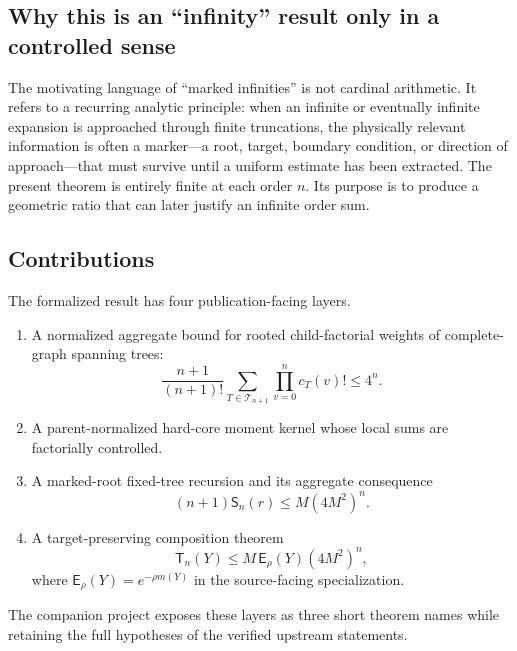 \documentclass[11pt]{article}
\newcommand{\Tree}{\mathcal T}
\newcommand{\ExpW}{\mathsf E}
\newcommand{\TargetTerm}{\mathsf T}
\newcommand{\MarkedSum}{\mathsf S}
\begin{document}
\subsection{Why this is an ``infinity'' result only in a controlled sense}

The motivating language of ``marked infinities'' is not cardinal arithmetic.  It refers to a recurring analytic principle: when an infinite or eventually infinite expansion is approached through finite truncations, the physically relevant information is often a marker---a root, target, boundary condition, or direction of approach---that must survive until a uniform estimate has been extracted.  The present theorem is entirely finite at each order $n$.  Its purpose is to produce a geometric ratio that can later justify an infinite order sum.

\subsection{Contributions}

The formalized result has four publication-facing layers.
\begin{enumerate}[leftmargin=2.5em]
  \item A normalized aggregate bound for rooted child-factorial weights of complete-graph spanning trees:
  \begin{equation}\label{eq:four-bound-intro}
    \frac{n+1}{(n+1)!}
    \sum_{T\in\Tree_{n+1}}
    \prod_{v=0}^{n} c_T(v)!
    \le 4^n.
  \end{equation}
  \item A parent-normalized hard-core moment kernel whose local sums are factorially controlled.
  \item A marked-root fixed-tree recursion and its aggregate consequence
  \begin{equation}\label{eq:marked-intro}
    (n+1)\MarkedSum_n(r)\le M(4M^2)^n.
  \end{equation}
  \item A target-preserving composition theorem
  \begin{equation}\label{eq:target-intro}
    \TargetTerm_n(Y)\le M\,\ExpW_\rho(Y)(4M^2)^n,
  \end{equation}
  where $\ExpW_\rho(Y)=e^{-\rho m(Y)}$ in the source-facing specialization.
\end{enumerate}

The companion project exposes these layers as three short theorem names while retaining the full hypotheses of the verified upstream statements.
\end{document}
